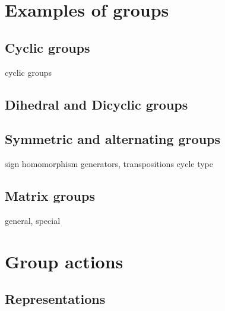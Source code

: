 \documentclass{../../large}
\begin{document}
\begin{prb}
\end{prb}







\chapter{Examples of groups}



\section{Cyclic groups}
\begin{prb}[Orders]
\end{prb}

cyclic groups

\section{Dihedral and Dicyclic groups}
\begin{prb}
\end{prb}
\begin{prb}
\end{prb}
\begin{prb}
\end{prb}

\section{Symmetric and alternating groups}

sign homomorphism
generators, transpositions
cycle type

\section{Matrix groups}
general, special







\chapter{Group actions}

\section{Representations}
\end{document}
